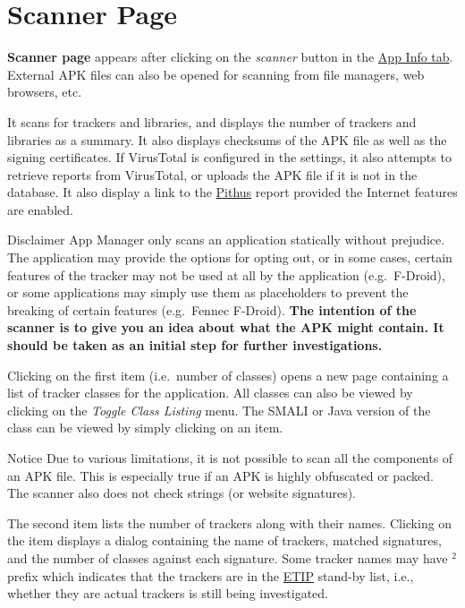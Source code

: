 \section{Scanner Page}\label{sec:scanner-page} %
\textbf{Scanner page} appears after clicking on the \emph{scanner} button in the \hyperref[subsec:app-info-tab]{App Info tab}.
External APK files can also be opened for scanning from file managers, web browsers, etc.

It scans for trackers and libraries, and displays the number of trackers and libraries as a summary.
It also displays checksums of the APK file as well as the signing certificates. If VirusTotal is
configured in the settings, it also attempts to retrieve reports from VirusTotal, or uploads the APK
file if it is not in the database. It also display a link to the \href{https://beta.pithus.org}{Pithus}
report provided the Internet features are enabled.

\begin{danger}{Disclaimer}
    App Manager only scans an application statically without prejudice. The application may provide
    the options for opting out, or in some cases, certain features of the tracker may not be used at
    all by the application (e.g.\ F-Droid), or some applications may simply use them as placeholders
    to prevent the breaking of certain features (e.g.\ Fennec F-Droid). \textbf{The intention of the
    scanner is to give you an idea about what the APK might contain. It should be taken as an
    initial step for further investigations.}
\end{danger}

Clicking on the first item (i.e.\ number of classes) opens a new page containing a list of tracker
classes for the application. All classes can also be viewed by clicking on the \textit{Toggle Class
Listing} menu. The SMALI or Java version of the class can be viewed by simply clicking on an item.

\begin{tip}{Notice}
    Due to various limitations, it is not possible to scan all the components of an APK file. This
    is especially true if an APK is highly obfuscated or packed. The scanner also does not check
    strings (or website signatures).
\end{tip}

The second item lists the number of trackers along with their names. Clicking on the item displays a
dialog containing the name of trackers, matched signatures, and the number of classes against each
signature. Some tracker names may have $^2$ prefix which indicates that the trackers are in the
\href{https://etip.exodus-privacy.eu.org}{ETIP} stand-by list, i.e., whether they are actual
trackers is still being investigated.

